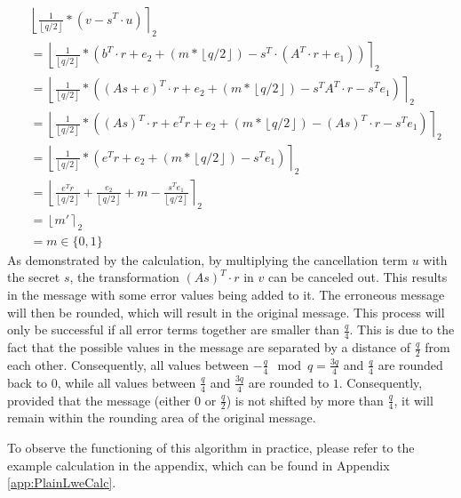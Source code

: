 \begin{align*}
   & \left\lfloor \frac{1}{\left\lfloor q/2\right\rfloor}*(v-s^T \cdot u)\right\rceil _2                                                                                     \\
   & = \left\lfloor \frac{1}{\left\lfloor q/2\right\rfloor}*(b^T \cdot r + e_2 + (m*\left\lfloor q/2\right\rfloor)-s^T \cdot (A^T \cdot r + e_1))\right\rceil _2             \\
   & = \left\lfloor \frac{1}{\left\lfloor q/2\right\rfloor}*((As+e)^T \cdot r + e_2 + (m*\left\lfloor q/2\right\rfloor)-s^T A^T \cdot r - s^T e_1)\right\rceil _2            \\
   & = \left\lfloor \frac{1}{\left\lfloor q/2\right\rfloor}*((As)^T \cdot r + e^Tr+ e_2 + (m*\left\lfloor q/2\right\rfloor)-(As)^T \cdot r - s^T e_1)\right\rceil _2         \\
   & = \left\lfloor \frac{1}{\left\lfloor q/2\right\rfloor}*(e^Tr+ e_2 + (m*\left\lfloor q/2\right\rfloor)- s^T e_1)\right\rceil _2                                          \\
   & = \left\lfloor \frac{e^Tr}{\left\lfloor q/2\right\rfloor}+ \frac{e_2 }{\left\lfloor q/2\right\rfloor}+ m - \frac{s^T e_1}{\left\lfloor q/2\right\rfloor}\right\rceil _2 \\
   & = \left\lfloor m' \right\rceil _2                                                                                                                                       \\
   & = m \in \{0,1\}
\end{align*}
As demonstrated by the calculation, by multiplying the cancellation term $u$ with the secret $s$, the transformation $(As)^T \cdot r$ in $v$ can be canceled out. This results in the message with some error values being added to it. The erroneous message will then be rounded, which will result in the original message. This process will only be successful if all error terms together are smaller than $\frac{q}{4}$. This is due to the fact that the possible values in the message are separated by a distance of $\frac{q}{2}$ from each other. Consequently, all values between $-\frac{q}{4}\mod q=\frac{3q}{4}$ and $\frac{q}{4}$ are rounded back to $0$, while all values between $\frac{q}{4}$ and $\frac{3q}{4}$ are rounded to $1$. Consequently, provided that the message (either $0$ or $\frac{q}{2}$) is not shifted by more than $\frac{q}{4}$, it will remain within the rounding area of the original message.


To observe the functioning of this algorithm in practice, please refer to the example calculation in the appendix, which can be found in Appendix \ref{app:PlainLweCalc}.